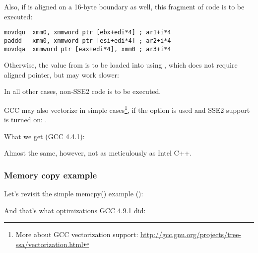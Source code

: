 Also, if  is aligned on a 16-byte boundary as well, 
this fragment of code is to be executed:

\begin{lstlisting}[style=customasmx86]
movdqu  xmm0, xmmword ptr [ebx+edi*4] ; ar1+i*4
paddd   xmm0, xmmword ptr [esi+edi*4] ; ar2+i*4
movdqa  xmmword ptr [eax+edi*4], xmm0 ; ar3+i*4
\end{lstlisting}

Otherwise, the value from  is to be loaded into  using \MOVDQU,
which does not require aligned pointer, but may work slower:



In all other cases, non-SSE2 code is to be executed.


\newcommand{\URLGCCVEC}{\url{http://gcc.gnu.org/projects/tree-ssa/vectorization.html}}

GCC may also vectorize in simple cases\footnote{More about GCC vectorization support: \URLGCCVEC},
if the \Othree option is used and SSE2 support is turned on: .

What we get (GCC 4.4.1):



Almost the same, however, not as meticulously as Intel C++.

\subsubsection{Memory copy example}
\label{vec_memcpy}

Let's revisit the simple memcpy() example
():



And that's what optimizations GCC 4.9.1 did:



